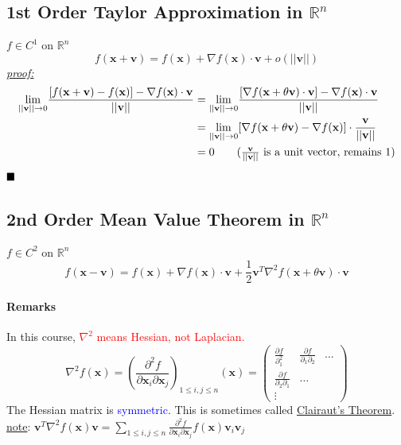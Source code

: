 \documentclass[11pt]{article}
\newcommand{\tb}[1]{\textbf{#1}}
\newcommand{\real}[0]{\mathbb{R}}
\newcommand{\under}[1]{\underline{#1}}
\newcommand{\proof}[0]{\textit{\underline{proof:} }}
\newcommand{\vx}[0]{\tb{x}}
\newcommand{\vv}[0]{\tb{v}}
\newcommand{\qed}[0]{$\hfill\blacksquare$}
\begin{document}
\subsection{1st Order Taylor Approximation in $\real^n$}
$f \in C^1$ on $\real^n$
$$f(\vx + \vv) = f(\vx) + \nabla f(\vx) \cdot \vv + o(||\vv||)$$
\proof \\
\begin{align*}
	\underset{||\vv|| \rightarrow 0}{\lim} \frac{[f(\vx + \vv) - f(\vx)] - \nabla f(\vx) \cdot \vv }{||\vv||} 
	&= \underset{||\vv|| \rightarrow 0}{\lim} \frac{[\nabla f(\vx + \theta \vv) \cdot \vv] - \nabla f(\vx) \cdot \vv}{||\vv||} \\
	&= \underset{||\vv|| \rightarrow 0}{\lim} [\nabla f(\vx + \theta \vv) - \nabla f(\vx)] \cdot \frac{\vv}{||\vv||} \\
	&= 0 \tag{$\frac{\vv}{||\vv||}$ is a unit vector, remains 1}
\end{align*}
\qed
\subsection{2nd Order Mean Value Theorem in $\real^n$}
$f \in C^2$ on $\real ^n$
$$ f(\vx - \vv) = f(\vx) + \nabla f(\vx) \cdot \vv + \frac{1}{2}\vv^T\nabla^2 f(\vx + \theta \vv) \cdot \vv$$
\paragraph{Remarks}
In this course, \textcolor{red}{$\nabla^2$ means Hessian, not Laplacian.}
$$\nabla^2 f(\vx) =  \left( \frac{\partial^2 f}{\partial \vx_i \partial \vx_j}\right)_{1\leq i, j\leq n}(\vx) = \begin{pmatrix}
	\frac{\partial f}{\partial_1^2} & \frac{\partial f}{\partial_1 \partial_2} & \hdots \\
	\frac{\partial f}{\partial_2 \partial_1} & \hdots \\
	\vdots
\end{pmatrix}$$
The Hessian matrix is \textcolor{blue}{symmetric}. This is sometimes called \under{Clairaut's Theorem}.\\
\under{note}: $\vv^T \nabla^2 f(\vx)\vv = \sum_{1 \leq i, j\leq n} \frac{\partial^2 f}{\partial \vx_i \partial \vx_j}f(\vx)\vv_i \vv_j$
\end{document}

